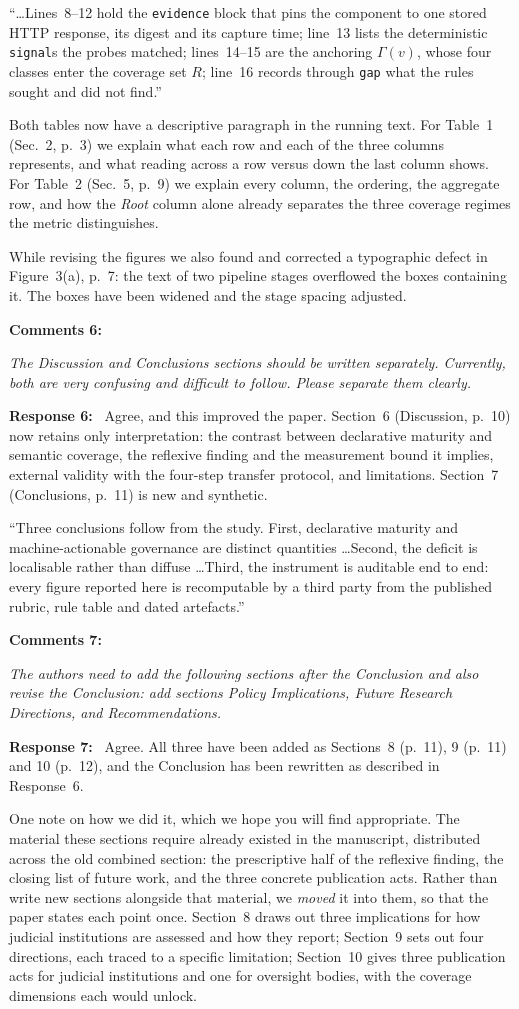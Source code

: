 \documentclass[10pt,a4paper]{article}
\newcommand{\rev}[1]{\textcolor{revred}{#1}}
\newenvironment{revcomment}
  {\begin{mdframed}[backgroundcolor=cmtbg, linecolor=cmtrule, linewidth=0.5pt,
     innertopmargin=5pt, innerbottommargin=5pt, innerleftmargin=7pt,
     innerrightmargin=7pt, skipabove=5pt, skipbelow=5pt]\small\itshape}
  {\end{mdframed}}
\newcommand{\cmt}[2]{\noindent\textbf{Comments #1:}\begin{revcomment}#2\end{revcomment}}
\newcommand{\rsp}[1]{\noindent\textbf{Response #1:}\ }
\begin{document}
\rev{``\dots Lines~8--12 hold the \texttt{evidence} block that pins the component to one stored HTTP response, its digest and its capture time; line~13 lists the deterministic \texttt{signal}s the probes matched; lines~14--15 are the anchoring $\Gamma(v)$, whose four classes enter the coverage set $R$; line~16 records through \texttt{gap} what the rules sought and did not find.''}

Both tables now have a descriptive paragraph in the running text. For Table~1 (Sec.~2, p.~3) we explain what each row and each of the three columns represents, and what reading across a row versus down the last column shows. For Table~2 (Sec.~5, p.~9) we explain every column, the ordering, the aggregate row, and how the \emph{Root} column alone already separates the three coverage regimes the metric distinguishes.

While revising the figures we also found and corrected a typographic defect in Figure~3(a), p.~7: the text of two pipeline stages overflowed the boxes containing it. The boxes have been widened and the stage spacing adjusted.

\cmt{6}{The Discussion and Conclusions sections should be written separately. Currently, both are very confusing and difficult to follow. Please separate them clearly.}
\rsp{6} Agree, and this improved the paper. Section~6 (Discussion, p.~10) now retains only interpretation: the contrast between declarative maturity and semantic coverage, the reflexive finding and the measurement bound it implies, external validity with the four-step transfer protocol, and limitations. Section~7 (Conclusions, p.~11) is new and synthetic.

\rev{``Three conclusions follow from the study. First, declarative maturity and machine-actionable governance are distinct quantities \dots Second, the deficit is localisable rather than diffuse \dots Third, the instrument is auditable end to end: every figure reported here is recomputable by a third party from the published rubric, rule table and dated artefacts.''}

\cmt{7}{The authors need to add the following sections after the Conclusion and also revise the Conclusion: add sections Policy Implications, Future Research Directions, and Recommendations.}
\rsp{7} Agree. All three have been added as Sections~8 (p.~11), 9 (p.~11) and 10 (p.~12), and the Conclusion has been rewritten as described in Response~6.

One note on how we did it, which we hope you will find appropriate. The material these sections require already existed in the manuscript, distributed across the old combined section: the prescriptive half of the reflexive finding, the closing list of future work, and the three concrete publication acts. Rather than write new sections alongside that material, we \emph{moved} it into them, so that the paper states each point once. Section~8 draws out three implications for how judicial institutions are assessed and how they report; Section~9 sets out four directions, each traced to a specific limitation; Section~10 gives three publication acts for judicial institutions and one for oversight bodies, with the coverage dimensions each would unlock.
\end{document}
